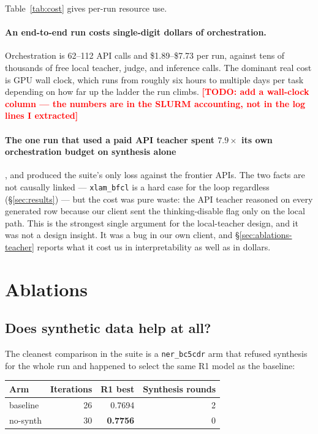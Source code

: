 \documentclass[sigconf,10pt]{acmart}
\newcommand{\xref}[1]{\S\ref{#1}}
\newcommand{\tsk}[1]{\texttt{#1}}
\newcommand{\TODO}[1]{\textcolor{red}{\textbf{[TODO: #1]}}}
\begin{document}
Table~\ref{tab:cost} gives per-run resource use.

\paragraph{An end-to-end run costs single-digit dollars of orchestration.} Orchestration is
62--112 API calls and \$1.89--\$7.73 per run, against tens of thousands of free local
teacher, judge, and inference calls. The dominant real cost is GPU wall clock, which runs
from roughly six hours to multiple days per task depending on how far up the ladder the run
climbs. \TODO{add a wall-clock column --- the numbers are in the SLURM accounting, not in the
log lines I extracted}

\paragraph{The one run that used a paid API teacher spent $7.9\times$ its own orchestration
budget on synthesis alone}, and produced the suite's only loss against the frontier APIs.
The two facts are not causally linked --- \tsk{xlam\_bfcl} is a hard case for the loop
regardless (\xref{sec:results}) --- but the cost was pure waste: the API teacher reasoned on
every generated row because our client sent the thinking-disable flag only on the local path.
This is the strongest single argument for the local-teacher design, and it was not a design
insight. It was a bug in our own client, and \xref{sec:ablations-teacher} reports what it
cost us in interpretability as well as in dollars.

\section{Ablations}
\label{sec:ablations}

\subsection{Does synthetic data help at all?}
\label{sec:ablations-nosynth}

The cleanest comparison in the suite is a \tsk{ner\_bc5cdr} arm that refused synthesis for the
whole run and happened to select the same R1 model as the baseline:

\begin{center}
\small
\begin{tabular}{@{}lrrr@{}}
\toprule
Arm & Iterations & R1 best & Synthesis rounds \\
\midrule
baseline           & 26 & 0.7694 & 2 \\
no-synth           & 30 & \textbf{0.7756} & 0 \\
\bottomrule
\end{tabular}
\end{center}
\end{document}
